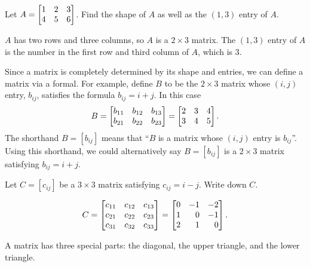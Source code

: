 \begin{example}Let $A=\mat{1&2&3\\4&5&6}$. Find the shape of $A$ as well as the $(1,3)$ entry of $A$.

	$A$ has two rows and three columns, so $A$ is a $2\times 3$ matrix. The $(1,3)$ entry of $A$
	is the number in the first row and third column of $A$, which is $3$.
\end{example}

Since a matrix is completely determined by its shape and entries, we can define a matrix via a formal. For example,
define $B$ to be the $2\times 3$ matrix whose $(i,j)$ entry, $b_{ij}$, satisfies the formula $b_{ij}=i+j$. In this case
\[
	B=\mat{b_{11}&b_{12}&b_{13}\\b_{21}&b_{22}&b_{23}}=\mat{2&3&4\\3&4&5}.
\]
The shorthand $B=[b_{ij}]$ means that ``$B$ is a matrix whose $(i,j)$ entry is $b_{ij}$''. Using this shorthand, we could
alternatively say $B=[b_{ij}]$ is a $2\times 3$ matrix satisfying $b_{ij}=i+j$.

\begin{example}
	Let $C=[c_{ij}]$ be a $3\times 3$ matrix satisfying $c_{ij}=i-j$. Write down $C$.

	\[
		C=\mat{c_{11}&c_{12}&c_{13}\\c_{21}&c_{22}&c_{23}\\c_{31}&c_{32}&c_{33}}=\mat{0&-1&-2\\1&0&-1\\2&1&0}.
	\]
\end{example}

A matrix has three special parts: the diagonal, the upper triangle, and the lower triangle.

